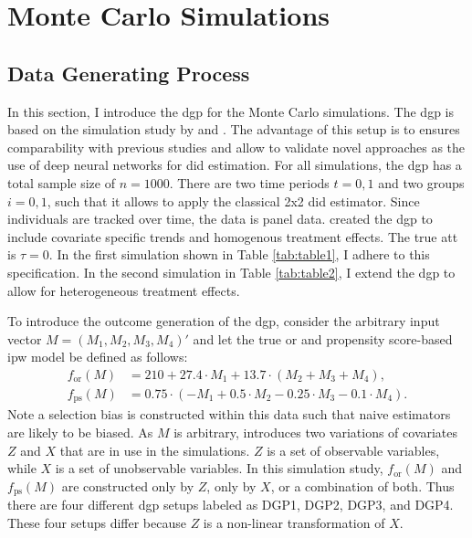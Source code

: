 \section{Monte Carlo Simulations}


\subsection{Data Generating Process}

In this section, I introduce the \ac{dgp} for the Monte Carlo simulations.
The \ac{dgp} is based on the simulation study by \citet{kang2007demystifying} and \citet{santannaDoublyRobustDifferenceindifferences2020}.
The advantage of this setup is to ensures comparability with previous studies and allow to validate novel approaches as the use of deep neural networks for \ac{did} estimation.
For all simulations, the \ac{dgp} has a total sample size of $n=1000$.
There are two time periods $t=0,1$ and two groups $i=0,1$, such that it allows to apply the classical 2x2 \ac{did} estimator.
Since individuals are tracked over time, the data is panel data.
\citet{kang2007demystifying} created the \ac{dgp} to include covariate specific trends and homogenous treatment effects.
The true \ac{att} is $\tau = 0$.
In the first simulation shown in Table \ref{tab:table1}, I adhere to this specification. In the second simulation in Table \ref{tab:table2}, I extend the \ac{dgp} to allow for heterogeneous treatment effects.

To introduce the outcome generation of the \ac{dgp}, consider the arbitrary input vector $M = (M_1, M_2, M_3, M_4)'$ and let the true \ac{or} and propensity score-based \ac{ipw} model be defined as follows:
\begin{align}
    f_{\text{or}}(M) &= 210 + 27.4 \cdot M_1 + 13.7 \cdot (M_2 + M_3 + M_4), \\
    f_{\text{ps}}(M) &= 0.75 \cdot (-M_1 + 0.5 \cdot M_2 - 0.25 \cdot M_3 - 0.1 \cdot M_4).
\end{align}
Note a selection bias is constructed within this data \citep{kang2007demystifying} such that naive estimators are likely to be biased.
As $M$ is arbitrary, \citet{kang2007demystifying} introduces two variations of covariates $Z$ and $X$ that are in use in the simulations.
$Z$ is a set of observable variables, while $X$ is a set of unobservable variables.
In this simulation study, $f_{\text{or}}(M)$ and $f_{\text{ps}}(M)$ are constructed only by $Z$, only by $X$, or a combination of both.
Thus there are four different \ac{dgp} setups labeled as DGP1, DGP2, DGP3, and DGP4.
These four setups differ because $Z$ is a non-linear transformation of $X$.

